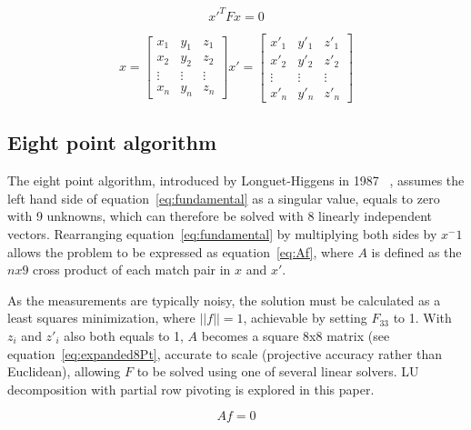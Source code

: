\documentclass[Conference]{IEEEtran}
\begin{document}
\begin{center}
\begin{equation}
{x}'^TFx = 0
\label{eq:fundamental}
\end{equation}
\end{center}

\begin{center}
\begin{equation}
x = \begin{bmatrix}
x_1&y_1&z_1\\ 
x_2&y_2&z_2\\ 
\vdots&\vdots&\vdots\\ 
x_n&y_n&z_n 
\end{bmatrix}
x' = \begin{bmatrix}
x'_1&y'_1&z'_1\\ 
x'_2&y'_2&z'_2\\ 
\vdots&\vdots&\vdots\\ 
x'_n&y'_n&z'_n
\end{bmatrix}
\label{eq:points}
\end{equation}
\end{center}

\subsection{Eight point algorithm}
The eight point algorithm, introduced by Longuet-Higgens in 1987 ~\cite{Longuet-Higgins:1987:CAR:33517.33523}, assumes the left hand side of equation~\eqref{eq:fundamental} as a singular value, equals to zero with 9 unknowns, which can therefore be solved with 8 linearly independent vectors. Rearranging equation~\eqref{eq:fundamental} by multiplying both sides by \({x}^-1\) allows the problem to be expressed as equation~\eqref{eq:Af}, where \(A\) is defined as the \(n x 9\) cross product of each match pair in \(x\) and \(x'\).

As the measurements are typically noisy, the solution must be calculated as a least squares minimization, where \(||f||=1\), achievable by setting \(F_{33}\) to 1. With \(z_i\)  and \(z'_i\) also both equals to 1, \(A\) becomes a square 8x8 matrix (see equation~\eqref{eq:expanded8Pt}, accurate to scale (projective accuracy rather than Euclidean), allowing \(F\) to be solved using one of several linear solvers. LU decomposition with partial row pivoting is explored in this paper.

\begin{equation}\label{eq:Af}Af=0\end{equation}
\end{document}
